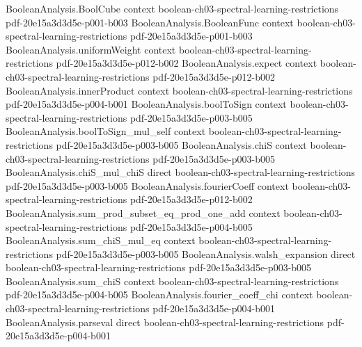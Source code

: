 \begin{lemma}
\label{KKL.tail_fourier_weight_bound}
\leanok
{}
\proofstep
  {BooleanAnalysis.BoolCube}
  {context}
  {boolean-ch03-spectral-learning-restrictions}
  {pdf-20e15a3d3d5e-p001-b003}
\proofstep
  {BooleanAnalysis.BooleanFunc}
  {context}
  {boolean-ch03-spectral-learning-restrictions}
  {pdf-20e15a3d3d5e-p001-b003}
\proofstep
  {BooleanAnalysis.uniformWeight}
  {context}
  {boolean-ch03-spectral-learning-restrictions}
  {pdf-20e15a3d3d5e-p012-b002}
\proofstep
  {BooleanAnalysis.expect}
  {context}
  {boolean-ch03-spectral-learning-restrictions}
  {pdf-20e15a3d3d5e-p012-b002}
\proofstep
  {BooleanAnalysis.innerProduct}
  {context}
  {boolean-ch03-spectral-learning-restrictions}
  {pdf-20e15a3d3d5e-p004-b001}
\proofstep
  {BooleanAnalysis.boolToSign}
  {context}
  {boolean-ch03-spectral-learning-restrictions}
  {pdf-20e15a3d3d5e-p003-b005}
\proofstep
  {BooleanAnalysis.boolToSign_mul_self}
  {context}
  {boolean-ch03-spectral-learning-restrictions}
  {pdf-20e15a3d3d5e-p003-b005}
\proofstep
  {BooleanAnalysis.chiS}
  {context}
  {boolean-ch03-spectral-learning-restrictions}
  {pdf-20e15a3d3d5e-p003-b005}
\proofstep
  {BooleanAnalysis.chiS_mul_chiS}
  {direct}
  {boolean-ch03-spectral-learning-restrictions}
  {pdf-20e15a3d3d5e-p003-b005}
\proofstep
  {BooleanAnalysis.fourierCoeff}
  {context}
  {boolean-ch03-spectral-learning-restrictions}
  {pdf-20e15a3d3d5e-p012-b002}
\proofstep
  {BooleanAnalysis.sum_prod_subset_eq_prod_one_add}
  {context}
  {boolean-ch03-spectral-learning-restrictions}
  {pdf-20e15a3d3d5e-p004-b005}
\proofstep
  {BooleanAnalysis.sum_chiS_mul_eq}
  {context}
  {boolean-ch03-spectral-learning-restrictions}
  {pdf-20e15a3d3d5e-p003-b005}
\proofstep
  {BooleanAnalysis.walsh_expansion}
  {direct}
  {boolean-ch03-spectral-learning-restrictions}
  {pdf-20e15a3d3d5e-p003-b005}
\proofstep
  {BooleanAnalysis.sum_chiS}
  {context}
  {boolean-ch03-spectral-learning-restrictions}
  {pdf-20e15a3d3d5e-p004-b005}
\proofstep
  {BooleanAnalysis.fourier_coeff_chi}
  {context}
  {boolean-ch03-spectral-learning-restrictions}
  {pdf-20e15a3d3d5e-p004-b001}
\proofstep
  {BooleanAnalysis.parseval}
  {direct}
  {boolean-ch03-spectral-learning-restrictions}
  {pdf-20e15a3d3d5e-p004-b001}
\proofstep

\end{lemma}
